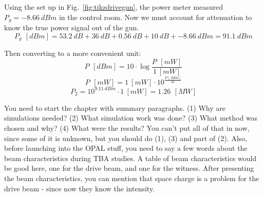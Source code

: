 \documentclass{iitthesis}
\newcommand{\lsnote}[1]{\textsf{{\color{violet}{ LS note:}   #1 }}}
\begin{document}
Using the set up in Fig.~\ref{fig:tikzdrivegun}, the power meter measured  $P_{g} = \SI{-8.66}{dBm}$
in the control room. Now we must account for attenuation to know the true power
signal out of the gun. 
\begin{equation}
P_g \, \SI{}{[dBm]} = \SI{53.2}{dB} + \SI{36}{dB} + \SI{0.56}{dB} + \SI{10}{dB} + \SI{-8.66}{dBm} = \SI{91.1}{dBm}
\end{equation}

Then converting to a more convenient unit: 
\begin{equation}
P \, \SI{}{[dBm]} = 10 \cdot \log{\frac{P \, \SI{}{[mW]}}{\SI{1}{[mW]}}}
\end{equation}
\begin{equation} \label{eq:dbmtomw}
P \, \SI{}{[mW]} = \SI{1}{[mW]} \cdot 10^{\frac{P \, [\SI{}{dBm}]}{\SI{10}{}}}
\end{equation}
\begin{equation} 
P_2 = 10^{\SI{9.11}{dBm}} \cdot  \SI{1}{[mW]} = 1.26 \, \SI{}{[MW]} 
\end{equation}


\label{sec:code}

\lsnote{You need to start the chapter with summary paragraphs.  (1) Why are simulations needed?  (2) What simulation work was done?  (3) What method was chosen and why?  (4) What were the results?  You can't put  all of that in now, since some of it is unknown, but you should do (1), (3) and part of (2).  Also, before launching into the OPAL stuff, you need to say a few words about the beam characteristics during TBA studies.  A table of beam characteristics would be good here, one for the drive beam, and one for the witness.  After presenting the beam characteristics, you can mention that space charge is a problem for the drive beam - since now they know the intensity.}
\end{document}
